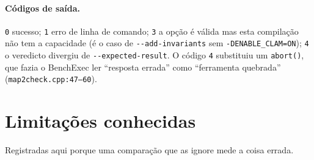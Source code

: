 \documentclass[11pt,a4paper]{article}
\newcommand{\enquote}[1]{``#1''}
\newcommand{\code}[1]{\texttt{#1}}
\newcommand{\flag}[1]{\texttt{-\/-#1}}
\newcommand{\src}[1]{{\small\texttt{#1}}}
\begin{document}
\paragraph{Códigos de saída.}
\code{0} sucesso; \code{1} erro de linha de comando; \code{3} a opção é válida
mas esta compilação não tem a capacidade (é o caso de \flag{add-invariants}
sem \code{-DENABLE\_CLAM=ON}); \code{4} o veredicto divergiu de
\flag{expected-result}. O código \code{4} substituiu um \code{abort()}, que
fazia o BenchExec ler \enquote{resposta errada} como \enquote{ferramenta
quebrada} (\src{map2check.cpp:47--60}).

\section{Limitações conhecidas}
\label{sec:limitacoes}

Registradas aqui porque uma comparação que as ignore mede a coisa errada.
\end{document}
